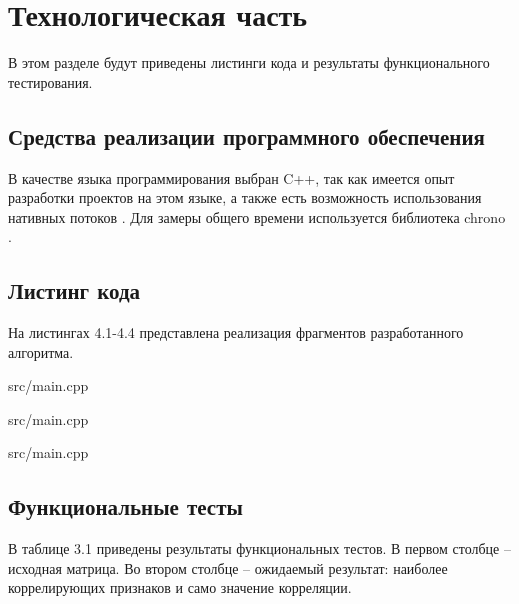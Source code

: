 \chapter{Технологическая часть}
В этом разделе будут приведены листинги кода и результаты функционального тестирования.

\section{Средства реализации программного обеспечения}
В качестве языка программирования выбран C++, так как имеется опыт разработки проектов на этом языке, 
а также есть возможность использования нативных потоков \cite{thread}.
Для замеры общего времени используется библиотека chrono \cite{time}.

\section{Листинг кода}
\FloatBarrier
На листингах 4.1-4.4 представлена реализация фрагментов разработанного алгоритма.

\begin{lstinputlisting}[language=C++, caption=Реализация линейного алгоритма, linerange={164-219}, 
	basicstyle=\footnotesize\ttfamily, frame=single,breaklines=true]{src/main.cpp}
\end{lstinputlisting}
\FloatBarrier

\FloatBarrier
\begin{lstinputlisting}[language=C++, caption=Реализация этапов вычислительного конвейера, linerange={221-300}, 
	basicstyle=\footnotesize\ttfamily, frame=single, breaklines=true]{src/main.cpp}
\end{lstinputlisting}
\FloatBarrier

\FloatBarrier
\begin{lstinputlisting}[language=C++, caption=Общая реализация вычислительного конвейера, linerange={303-344}, 
	basicstyle=\footnotesize\ttfamily, frame=single, breaklines=true]{src/main.cpp}
\end{lstinputlisting}
\FloatBarrier

\section{Функциональные тесты}
В таблице 3.1 приведены результаты функциональных тестов. 
В первом столбце -- исходная матрица.
Во втором столбце -- ожидаемый результат: наиболее коррелирующих признаков и само значение корреляции.

